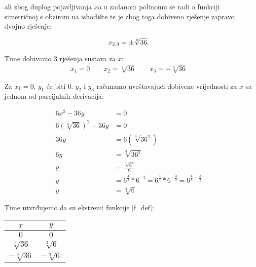 ali zbog duplog pojavljivanja $x$a u zadanom polinomu se radi o funkciji simetričnoj s obzirom na ishodište te je zbog toga dobiveno rješenje zapravo dvojno rješenje:

$$
x_{2,3} = \pm \sqrt[3]{36} \textnormal{.}
$$

Time dobivamo 3 rješenja sustava za $x$:
\begin{gather*}
    x_1 = 0 \qquad x_2 = \sqrt[3]{36} \qquad x_3 = -\sqrt[3]{36}
\end{gather*}

Za $x_1 = 0$, $y_1$ će biti $0$. $y_2$ i $y_3$ računamo uvrštavajući dobivene vrijednosti za $x$ sa jednom od parcijalnih derivacija:

\begin{align*}
    6x^2 - 36y &= 0\\
    6(\sqrt[3]{36})^2 - 36y &= 0\\
    36y &= 6(\sqrt[3]{36^2})\\
    6y &= \sqrt[3]{36^2} \\
    y &= \frac{\sqrt[3]{6^4}}{6} \\
    y &= 6^{\frac{4}{3}} * 6^{-1} = 6^{\frac{4}{3}} * 6^{-\frac{3}{3}} = 6^{\frac{4}{3} - \frac{3}{3}} \\
    y &= \sqrt[3]6
\end{align*}

Time utvrđujemo da su ekstremi funkcije \eqref{f_def}:

\begin{center}
\begin{tabular}{c | c}
    $x$ & $y$ \\
    \hline
    $0$ & $0$ \\
    $\sqrt[3]{36}$ & $\sqrt[3]6$ \\
    $-\sqrt[3]{36}$ & $-\sqrt[3]6$ \\
\end{tabular}
\end{center}

\newpage